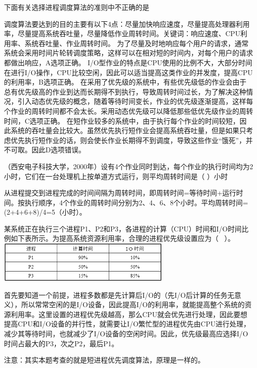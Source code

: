 \question 下面有关选择进程调度算法的准则中不正确的是
\par{}
\begin{solution}调度算法要达到的目的主要有以下4点：尽量加快响应速度，尽量提高处理器利用率，尽量提高系统吞吐量，尽量降低作业周转时间。关键词：响应速度、CPU利用率、系统吞吐量、作业周转时间。
为了尽量及时地响应每个用户的请求，通常系统会采用时间片轮转调度策略，这样可以在相对短的时间内，对每个用户的请求都做出响应，A选项正确。
I/O型作业的特点是CPU使用的比例不大，大部分时间在进行I/O操作，CPU比较空闲，因此可以适当提高这类作业的并发度，提高CPU的利用率，B选项正确。
在采用了优先级的系统中，有些优先级低的作业会由于总有优先级高的作业到达而长期得不到执行，导致周转时间过长，为了解决这种情况，引入动态优先级的概念，随着等待时间变长，作业的优先级逐渐提高，这样每个作业的周转时间都不会太长。采用动态优先级可以降低那些低优先级作业的周转时间，C选项正确。
在短作业较多的系统中，由于执行每个作业的时间较短，因此系统的吞吐量会比较大。虽然优先执行短作业会提高系统吞吐量，但是如果只考虑优先执行短作业的话，则会使长作业长期得不到调度，导致这些作业``饿死''，并不可取。因此D选项错误。
\end{solution}
\question （西安电子科技大学，2000年）设有4个作业同时到达，每个作业的执行时间均为2小时，它们在一台处理机上按单道方式运行，则平均周转时间是（
）小时
\par{}
\begin{solution}从进程提交到进程完成的时间间隔为周转时间，即周转时间=等待时间+运行时间。按执行顺序，4个作业的周转时间分别为2、4、6、8个小时。平均周转时间=(2+4+6+8)/4=5（小时）。
\end{solution}
\question 某系统正在执行三个进程P1、P2和P3，各进程的计算（CPU）时间和I/O时间比例如下表所示。为提高系统资源利用率，合理的进程优先级设置应为（
~）。
\includegraphics[width=3.33333in,height=0.79167in]{computerassets/DF32FF3C08A6FE076B80C8533203918A.png}
\par\fourch{}{\textcolor{red}{}}{}{}
\begin{solution}首先要知道一个前提，进程多数都是先计算后I/O的（先I/O后计算的任务无意义），所以常常空闲的是I/O设备，因此提高I/O的利用率，就能提高整个系统的资源利用率。这里设置的进程优先级越高，那么CPU就会优先进行处理，因此要想提高CPU和I/O设备的并行性，就需要让I/O繁忙型的进程优先由CPU进行处理，减少其等待时间，也就减少了I/O设备的空闲时间。因此，优先级最高应选择I/O时间占最大的P3，次之P2，最后P1。
~ ~ ~ ~~

注意：其实本题考查的就是短进程优先调度算法，原理是一样的。
\end{solution}
